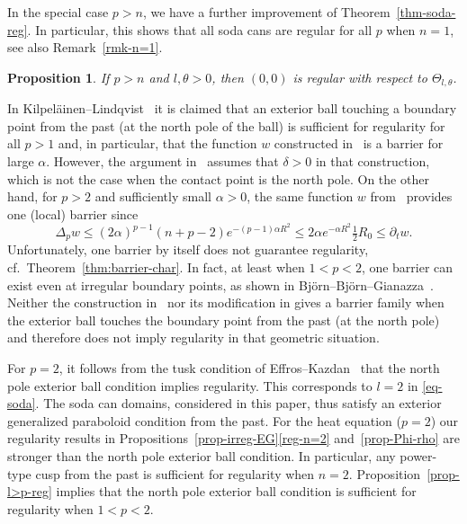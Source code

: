 \documentclass[a4paper, twoside]{article}
\theoremstyle{propositional}
\newtheorem{prop}[thm]{Proposition}
\theoremstyle{descriptive}
\numberwithin{equation}{section}
\newcommand{\al}{\alpha}
\newcommand{\de}{\delta}
\begin{document}
In the special case $p>n$, we have a further   
improvement of  Theorem~\ref{thm-soda-reg}.
In particular,  this shows that all soda cans
are regular for all $p$ when $n=1$, see also Remark~\ref{rmk-n=1}.

\begin{prop} \label{prop-soda-p>n}
If $p>n$ and $l,\theta >0$, then 
$(0,0)$  is regular with respect to $\Theta_{l,\theta}$.
\end{prop}


In Kilpel\"ainen--Lindqvist~\cite[p.~675]{KiLi96} it is claimed that an exterior ball
touching a boundary point from the past
(at the north pole of the ball) 
is sufficient for regularity
for all $p>1$
and, in particular, that the function $w$ constructed in~\cite[p.~674]{KiLi96} is a barrier
for large $\al$.
However, the argument in~\cite[p.~674--675]{KiLi96} assumes that $\de>0$ in that construction, which is not
the case when the contact point is the north pole.
On the other hand, for 
$p>2$ and sufficiently small $\al>0$, 
the same function $w$ from~\cite[p.~674]{KiLi96} 
provides one (local) barrier since 
\[
\Delta_p w \le (2\al)^{p-1}(n +p-2) e^{-(p-1)\al R^2} 
\le 2\al e^{-\al R^2} \tfrac12 R_0 \le \partial_t w. 
\]
Unfortunately, one barrier by itself does not guarantee regularity, cf.\ Theorem~\ref{thm:barrier-char}.
In fact, at least when $1<p<2$, one barrier can exist even at irregular boundary points, as shown in 
Bj\"orn--Bj\"orn--Gianazza~\cite[Proposition~1.2]{BBG}.
Neither the construction in~\cite[p.~674]{KiLi96}  nor its modification in \cite[Proposition~4.1]{BBGP}
gives a barrier family 
when the exterior ball touches the boundary point from the past
(at the north pole)
and therefore
does not imply regularity in that geometric situation.

For $p=2$, it follows from the tusk condition
of Effros--Kazdan~\cite{EfKaz} that 
the north pole exterior ball condition implies regularity.
This corresponds to $l=2$ in \eqref{eq-soda}.
The soda can domains, considered in this paper, thus
satisfy an exterior generalized paraboloid condition from the past.
For the heat equation ($p=2$) our regularity results in 
Propositions~\ref{prop-irreg-EG}\ref{reg-n=2} and~\ref{prop-Phi-rho}
are stronger than the north pole exterior ball condition.
In particular, any power-type cusp from the past is sufficient 
for regularity when $n=2$.
Proposition~\ref{prop-l>p-reg} implies that the north pole exterior ball condition 
is sufficient for regularity when $1<p<2$.
\end{document}
